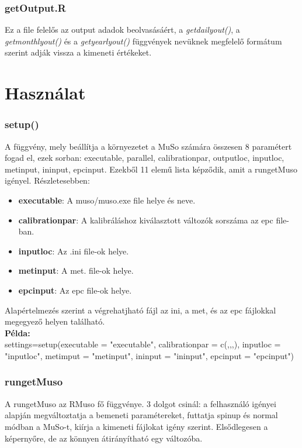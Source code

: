 \documentclass[12pt,a4paper]{article}
\begin{document}
\subsubsection*{getOutput.R}
Ez a file felelős az output adadok beolvasásáért, a \textit{getdailyout()}, a  \textit{getmonthlyout()} és a  \textit{getyearlyout()} függvények nevüknek megfelelő formátum szerint adják vissza a kimeneti értékeket.
\section{Használat}

\subsubsection*{setup()}
A függvény, mely beállítja a környezetet a MuSo számára összesen 8 paramétert fogad el, ezek sorban: executable, parallel, calibrationpar, outputloc, inputloc, metinput, ininput, epcinput. Ezekből 11 elemű lista képződik, amit a rungetMuso igényel. Részletesebben:

\begin{itemize}
\item \textbf{executable}: A muso/muso.exe file helye és neve.
\item \textbf{calibrationpar}: A kalibráláshoz kiválasztott változók sorszáma az epc file-ban.
\item \textbf{inputloc}: Az .ini file-ok helye.
\item \textbf{metinput}: A met. file-ok helye.
\item \textbf{epcinput}: Az epc file-ok helye.
\end{itemize}

Alapértelmezés szerint a végrehatjható fájl az ini, a met, és az epc fájlokkal megegyező helyen található.\\  
\newline \newline
\textbf{Példa:}\\
  settings=setup(executable = "executable", calibrationpar = c(,,,), inputloc = "inputloc", metimput = "metinput", ininput = "ininput", epcinput = "epcinput")
\subsubsection*{rungetMuso}
A rungetMuso az RMuso fő függvénye. 3 dolgot csinál: a felhasználó igényei alapján megváltoztatja a bemeneti paramétereket, futtatja spinup és normal módban a MuSo-t, kiírja a kimeneti fájlokat igény szerint. Elsődlegesen a képernyőre, de az könnyen átirányítható egy változóba. \par
\end{document}
